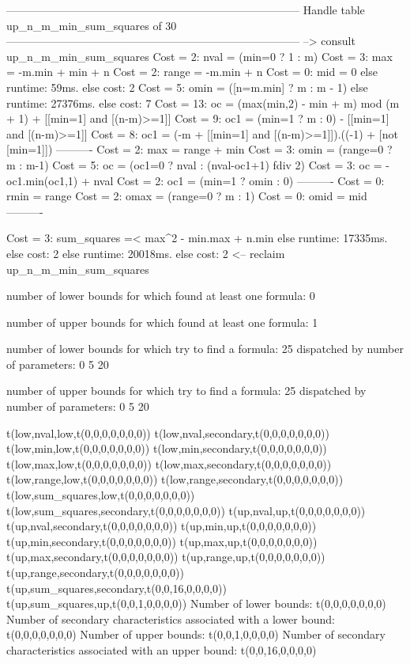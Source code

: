 --------------------------------------------------------------------------------
Handle table up_n_m_min_sum_squares of 30
--------------------------------------------------------------------------------
--> consult up_n_m_min_sum_squares
Cost =  2:  nval  = (min=0 ? 1 : m)
Cost =  3:  max   = -m.min + min + n
Cost =  2:  range = -m.min + n
Cost =  0:  mid   = 0
else runtime: 59ms. else cost: 2
Cost =  5:  omin  = ([n=m.min] ? m : m - 1) %
else runtime: 27376ms. else cost: 7
Cost = 13:  oc    = (max(min,2) - min + m) mod (m + 1) + [[min=1] and [(n-m)>=1]] %
Cost =  9:  oc1   = (min=1 ? m : 0) - [[min=1] and [(n-m)>=1]] %
Cost =  8:  oc1   = (-m + [[min=1] and [(n-m)>=1]]).((-1) + [not [min=1]]) %
----------
Cost =  2:  max   = range + min
Cost =  3:  omin  = (range=0 ? m : m-1)
Cost =  5:  oc    = (oc1=0 ? nval : (nval-oc1+1) fdiv 2)
Cost =  3:  oc    = -oc1.min(oc1,1) + nval
Cost =  2:  oc1   = (min=1 ? omin : 0)
----------
Cost =  0:  rmin  = range
Cost =  2:  omax  = (range=0 ? m : 1)
Cost =  0:  omid  = mid
----------

Cost =  3:  sum_squares =< max^2 - min.max + n.min
else runtime: 17335ms. else cost: 2
else runtime: 20018ms. else cost: 2
<-- reclaim up_n_m_min_sum_squares

number of lower bounds for which found at least one formula: 0

number of upper bounds for which found at least one formula: 1

number of lower bounds for which try to find a formula: 25
dispatched by number of parameters: 0  5  20

number of upper bounds for which try to find a formula: 25
dispatched by number of parameters: 0  5  20

t(low,nval,low,t(0,0,0,0,0,0,0))
t(low,nval,secondary,t(0,0,0,0,0,0,0))
t(low,min,low,t(0,0,0,0,0,0,0))
t(low,min,secondary,t(0,0,0,0,0,0,0))
t(low,max,low,t(0,0,0,0,0,0,0))
t(low,max,secondary,t(0,0,0,0,0,0,0))
t(low,range,low,t(0,0,0,0,0,0,0))
t(low,range,secondary,t(0,0,0,0,0,0,0))
t(low,sum_squares,low,t(0,0,0,0,0,0,0))
t(low,sum_squares,secondary,t(0,0,0,0,0,0,0))
t(up,nval,up,t(0,0,0,0,0,0,0))
t(up,nval,secondary,t(0,0,0,0,0,0,0))
t(up,min,up,t(0,0,0,0,0,0,0))
t(up,min,secondary,t(0,0,0,0,0,0,0))
t(up,max,up,t(0,0,0,0,0,0,0))
t(up,max,secondary,t(0,0,0,0,0,0,0))
t(up,range,up,t(0,0,0,0,0,0,0))
t(up,range,secondary,t(0,0,0,0,0,0,0))
t(up,sum_squares,secondary,t(0,0,16,0,0,0,0))
t(up,sum_squares,up,t(0,0,1,0,0,0,0))
Number of lower bounds:                                             t(0,0,0,0,0,0,0)
Number of secondary characteristics associated with a lower bound:  t(0,0,0,0,0,0,0)
Number of upper bounds:                                             t(0,0,1,0,0,0,0)
Number of secondary characteristics associated with an upper bound: t(0,0,16,0,0,0,0)

